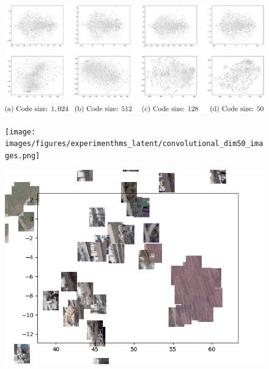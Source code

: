 \begin{frame}
	\begin{figure}
		\includegraphics[width=\textwidth]{images/figures/presentation/tsne-DSM.jpg}
	\end{figure}
\end{frame}

\begin{frame}
	\begin{figure}
		\texttt{[image: images/figures/experimenthms\_latent/convolutional\_dim50\_images.png]}
	\end{figure}
\end{frame}

\begin{frame}
	\begin{figure}
		\includegraphics[width=\textwidth]
		{images/figures/experiments_latent/convolutional_dim50_images_upwards_observation.png}
	\end{figure}
\end{frame}

